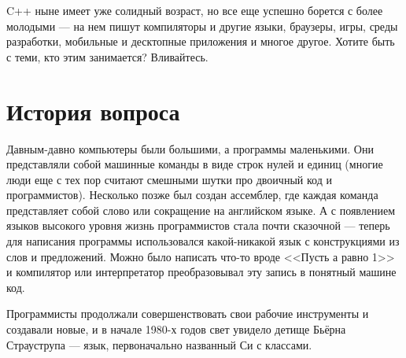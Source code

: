 \documentclass{article}
\begin{document}
C++ ныне имеет уже солидный возраст, но все еще успешно борется с более молодыми --- на нем пишут компиляторы и другие языки, браузеры, игры, среды разработки, мобильные и десктопные приложения и многое другое. Хотите быть с теми, кто этим занимается? Вливайтесь.

\section*{История вопроса}

Давным-давно компьютеры были большими, а программы маленькими. Они представляли собой машинные команды в виде строк нулей и единиц (многие люди еще с тех пор считают смешными шутки про двоичный код и программистов). Несколько позже был создан ассемблер, где каждая команда представляет собой слово или сокращение на английском языке. А с появлением языков высокого уровня жизнь программистов стала почти сказочной --- теперь для написания программы использовался какой-никакой язык с конструкциями из слов и предложений. Можно было написать что-то вроде <<Пусть а равно 1>> и компилятор или интерпретатор преобразовывал эту запись в понятный машине код.


Программисты продолжали совершенствовать свои рабочие инструменты и создавали новые, и в начале 1980-х годов свет увидело детище Бьёрна Страуструпа --- язык, первоначально названный Си с классами. 
\end{document}

